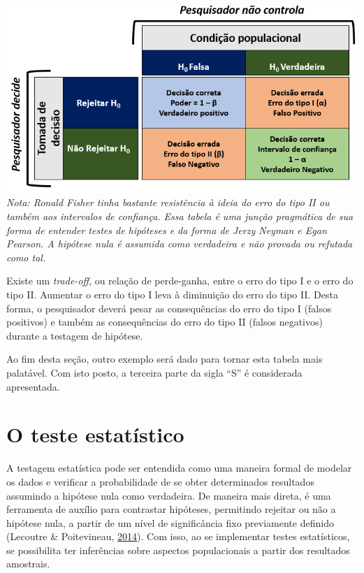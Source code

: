 \documentclass[
]{book}
\begin{document}
\includegraphics{./img/cap_inferencia_tabela_decisao.png} \emph{Nota:
Ronald Fisher tinha bastante resistência à ideia do erro do tipo II ou
também aos intervalos de confiança. Essa tabela é uma junção pragmática
de sua forma de entender testes de hipóteses e da forma de Jerzy Neyman
e Egan Pearson. A hipótese nula é assumida como verdadeira e não provada
ou refutada como tal.}

Existe um \emph{trade-off}, ou relação de perde-ganha, entre o erro do
tipo I e o erro do tipo II. Aumentar o erro do tipo I leva à diminuição
do erro do tipo II. Desta forma, o pesquisador deverá pesar as
consequências do erro do tipo I (falsos positivos) e também as
consequências do erro do tipo II (falsos negativos) durante a testagem
de hipótese.

Ao fim desta seção, outro exemplo será dado para tornar esta tabela mais
palatável. Com isto posto, a terceira parte da sigla ``S'' é considerada
apresentada.

\hypertarget{o-teste-estatuxedstico}{%
\section{O teste estatístico}\label{o-teste-estatuxedstico}}

A testagem estatística pode ser entendida como uma maneira formal de
modelar os dados e verificar a probabilidade de se obter determinados
resultados assumindo a hipótese nula como verdadeira. De maneira mais
direta, é uma ferramenta de auxílio para contrastar hipóteses,
permitindo rejeitar ou não a hipótese nula, a partir de um nível de
significância fixo previamente definido (Lecoutre \& Poitevineau,
\protect\hyperlink{ref-Lecoutre2014}{2014}). Com isso, ao se implementar
testes estatísticos, se possibilita ter inferências sobre aspectos
populacionais a partir dos resultados amostrais.
\end{document}
